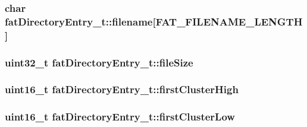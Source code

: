 \hypertarget{structfatDirectoryEntry__t_a3fa42bbc5761c2fc01626dbea5030619}{
\subsubsection[{filename}]{\setlength{\rightskip}{0pt plus 5cm}char fat\+Directory\+Entry\+\_\+t\+::filename\mbox{[}{\bf F\+A\+T\+\_\+\+F\+I\+L\+E\+N\+A\+M\+E\+\_\+\+L\+E\+N\+G\+T\+H}\mbox{]}}}\label{structfatDirectoryEntry__t_a3fa42bbc5761c2fc01626dbea5030619}
\hypertarget{structfatDirectoryEntry__t_aafa2b819301ef0b233d83282714635c9}{
\subsubsection[{file\+Size}]{\setlength{\rightskip}{0pt plus 5cm}uint32\+\_\+t fat\+Directory\+Entry\+\_\+t\+::file\+Size}}\label{structfatDirectoryEntry__t_aafa2b819301ef0b233d83282714635c9}
\hypertarget{structfatDirectoryEntry__t_ad75f69ae03df544898f9a3146b7b063e}{
\subsubsection[{first\+Cluster\+High}]{\setlength{\rightskip}{0pt plus 5cm}uint16\+\_\+t fat\+Directory\+Entry\+\_\+t\+::first\+Cluster\+High}}\label{structfatDirectoryEntry__t_ad75f69ae03df544898f9a3146b7b063e}
\hypertarget{structfatDirectoryEntry__t_a10d62b00d3b533b22d77e4077838dbcf}{
\subsubsection[{first\+Cluster\+Low}]{\setlength{\rightskip}{0pt plus 5cm}uint16\+\_\+t fat\+Directory\+Entry\+\_\+t\+::first\+Cluster\+Low}}\label{structfatDirectoryEntry__t_a10d62b00d3b533b22d77e4077838dbcf}

